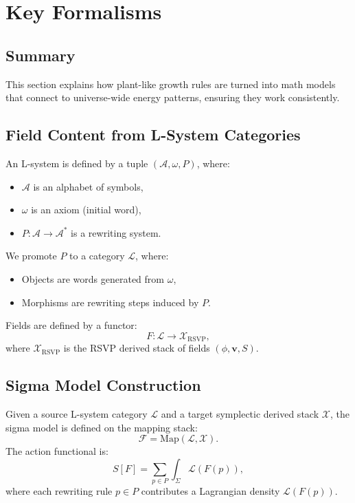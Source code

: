 \documentclass[11pt,oneside]{memoir}
\theoremstyle{plain}
\newcommand{\F}{\mathcal{F}}
\newcommand{\X}{\mathcal{X}}
\newcommand{\A}{\mathcal{A}}
\newcommand{\Lcal}{\mathcal{L}} %
\begin{document}
\section{Key Formalisms}
\subsection{Summary}
This section explains how plant-like growth rules are turned into math models that connect to universe-wide energy patterns, ensuring they work consistently.

\subsection{Field Content from L-System Categories}
An L-system is defined by a tuple \((\A, \omega, P)\), where:
\begin{itemize}
    \item \(\A\) is an alphabet of symbols,
    \item \(\omega\) is an axiom (initial word),
    \item \(P: \A \to \A^*\) is a rewriting system.
\end{itemize}
We promote \(P\) to a category \(\Lcal\), where:
\begin{itemize}
    \item Objects are words generated from \(\omega\),
    \item Morphisms are rewriting steps induced by \(P\).
\end{itemize}
Fields are defined by a functor:
\begin{equation}
    F : \Lcal \longrightarrow \X_{\mathrm{RSVP}},
\end{equation}
where \(\X_{\mathrm{RSVP}}\) is the RSVP derived stack of fields \((\phi, \mathbf{v}, S)\).

\subsection{Sigma Model Construction}
Given a source L-system category \(\Lcal\) and a target symplectic derived stack \(\X\), the sigma model is defined on the mapping stack:
\begin{equation}
    \F = \mathrm{Map}(\Lcal, \X).
\end{equation}
The action functional is:
\begin{equation}
    S[F] = \sum_{p \in P} \int_\Sigma \mathcal{L}(F(p)),
\end{equation}
where each rewriting rule \(p \in P\) contributes a Lagrangian density \(\mathcal{L}(F(p))\).
\end{document}
